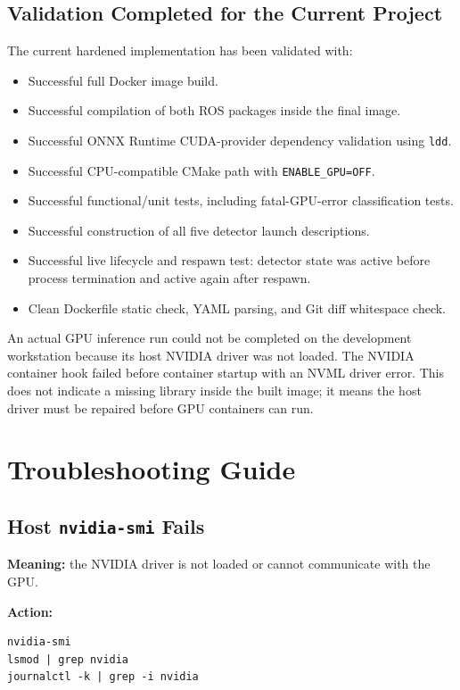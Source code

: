 \documentclass[11pt,a4paper]{article}
\begin{document}
\subsection{Validation Completed for the Current Project}

The current hardened implementation has been validated with:

\begin{itemize}
  \item Successful full Docker image build.
  \item Successful compilation of both ROS packages inside the final image.
  \item Successful ONNX Runtime CUDA-provider dependency validation using \texttt{ldd}.
  \item Successful CPU-compatible CMake path with \texttt{ENABLE\_GPU=OFF}.
  \item Successful functional/unit tests, including fatal-GPU-error classification tests.
  \item Successful construction of all five detector launch descriptions.
  \item Successful live lifecycle and respawn test: detector state was active before process termination and active again after respawn.
  \item Clean Dockerfile static check, YAML parsing, and Git diff whitespace check.
\end{itemize}

An actual GPU inference run could not be completed on the development workstation because its host NVIDIA driver was not loaded. The NVIDIA container hook failed before container startup with an NVML driver error. This does not indicate a missing library inside the built image; it means the host driver must be repaired before GPU containers can run.

\section{Troubleshooting Guide}

\subsection{Host \texttt{nvidia-smi} Fails}

\textbf{Meaning:} the NVIDIA driver is not loaded or cannot communicate with the GPU.

\textbf{Action:}

\begin{lstlisting}
nvidia-smi
lsmod | grep nvidia
journalctl -k | grep -i nvidia
\end{lstlisting}
\end{document}
